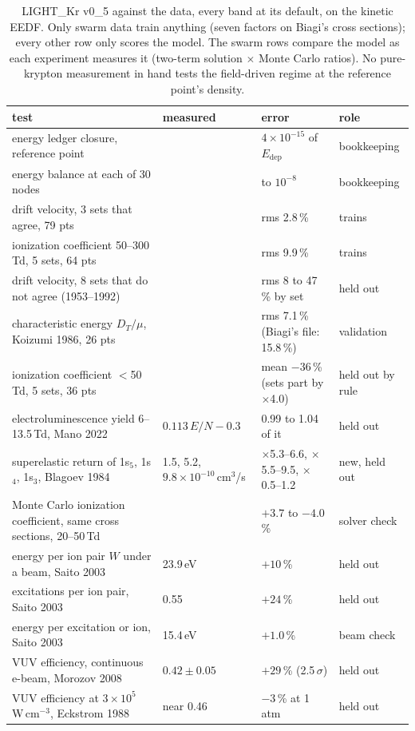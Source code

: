 \documentclass[11pt]{article}
\newcommand{\Edep}{\ensuremath{E_\mathrm{dep}}}
\newcommand{\x}{\ensuremath{\times}}
\begin{document}
\begin{table}[H]
\small
\begin{tabularx}{\textwidth}{@{}Xlll@{}}
\toprule
test & measured & error & role \\
\midrule
energy ledger closure, reference point & & $4\times10^{-15}$ of \Edep{} & bookkeeping \\
energy balance at each of 30 nodes & & to $10^{-8}$ & bookkeeping \\
\midrule
drift velocity, 3 sets that agree, 79 pts & & rms 2.8\,\% & trains \\
ionization coefficient 50--300\,Td, 5 sets, 64 pts & & rms 9.9\,\% & trains \\
drift velocity, 8 sets that do not agree (1953--1992) & & rms 8 to 47\,\% by set & held out \\
characteristic energy $D_T/\mu$, Koizumi 1986, 26 pts & & rms 7.1\,\% (Biagi's file: 15.8\,\%) & validation \\
ionization coefficient $<$50\,Td, 5 sets, 36 pts & & mean $-36$\,\% (sets part by \x4.0) & held out by rule \\
electroluminescence yield 6--13.5\,Td, Mano 2022 & $0.113\,E/N-0.3$ & 0.99 to 1.04 of it & held out \\
superelastic return of 1s$_5$, 1s$_4$, 1s$_3$, Blagoev 1984 & 1.5, 5.2, $9.8\times10^{-10}$\,cm$^3$/s & \x5.3--6.6, \x5.5--9.5, \x0.5--1.2 & new, held out \\
Monte Carlo ionization coefficient, same cross sections, 20--50\,Td & & $+3.7$ to $-4.0$\,\% & solver check \\
\midrule
energy per ion pair $W$ under a beam, Saito 2003 & 23.9\,eV & $+10$\,\% & held out \\
excitations per ion pair, Saito 2003 & 0.55 & $+24$\,\% & held out \\
energy per excitation or ion, Saito 2003 & 15.4\,eV & $+1.0$\,\% & beam check \\
VUV efficiency, continuous e-beam, Morozov 2008 & $0.42\pm0.05$ & $+29$\,\% (2.5\,$\sigma$) & held out \\
VUV efficiency at $3\times10^5$\,W\,cm$^{-3}$, Eckstrom 1988 & near 0.46 & $-3$\,\% at 1\,atm & held out \\
\bottomrule
\end{tabularx}
\caption{LIGHT\_Kr v0\_5 against the data, every band at its default, on
the kinetic EEDF. Only swarm data train anything (seven factors on Biagi's
cross sections); every other row only scores the model. The swarm rows
compare the model as each experiment measures it (two-term solution \x{}
Monte Carlo ratios). No pure-krypton measurement in hand tests the
field-driven regime at the reference point's density.}
\end{table}
\end{document}
